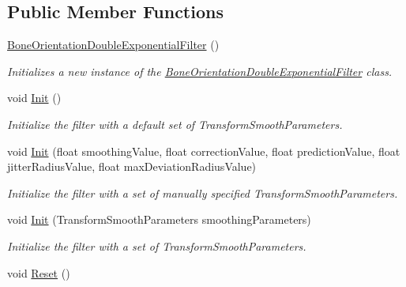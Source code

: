 \subsection*{Public Member Functions}
\begin{DoxyCompactItemize}
\item 
\hyperlink{class_microsoft_1_1_samples_1_1_kinect_1_1_avateering_1_1_filters_1_1_bone_orientation_double_exponential_filter_a2aeb562b90f6301b68b5324d4da4dbea}{Bone\+Orientation\+Double\+Exponential\+Filter} ()
\begin{DoxyCompactList}\small\item\em Initializes a new instance of the \hyperlink{class_microsoft_1_1_samples_1_1_kinect_1_1_avateering_1_1_filters_1_1_bone_orientation_double_exponential_filter}{Bone\+Orientation\+Double\+Exponential\+Filter} class. \end{DoxyCompactList}\item 
void \hyperlink{class_microsoft_1_1_samples_1_1_kinect_1_1_avateering_1_1_filters_1_1_bone_orientation_double_exponential_filter_ac4f31c433d987f3c00aba1c7030dcac1}{Init} ()
\begin{DoxyCompactList}\small\item\em Initialize the filter with a default set of Transform\+Smooth\+Parameters. \end{DoxyCompactList}\item 
void \hyperlink{class_microsoft_1_1_samples_1_1_kinect_1_1_avateering_1_1_filters_1_1_bone_orientation_double_exponential_filter_aa1cebd0fa89cd018a19331b1700899e3}{Init} (float smoothing\+Value, float correction\+Value, float prediction\+Value, float jitter\+Radius\+Value, float max\+Deviation\+Radius\+Value)
\begin{DoxyCompactList}\small\item\em Initialize the filter with a set of manually specified Transform\+Smooth\+Parameters. \end{DoxyCompactList}\item 
void \hyperlink{class_microsoft_1_1_samples_1_1_kinect_1_1_avateering_1_1_filters_1_1_bone_orientation_double_exponential_filter_add12af77eef691117c7096d2b36e7d2c}{Init} (Transform\+Smooth\+Parameters smoothing\+Parameters)
\begin{DoxyCompactList}\small\item\em Initialize the filter with a set of Transform\+Smooth\+Parameters. \end{DoxyCompactList}\item 
void \hyperlink{class_microsoft_1_1_samples_1_1_kinect_1_1_avateering_1_1_filters_1_1_bone_orientation_double_exponential_filter_a5cf091bee884e8b794fe230c0a1772b9}{Reset} ()

\end{DoxyCompactItemize}
